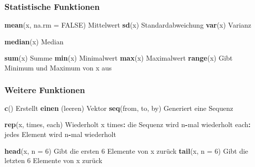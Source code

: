 \documentclass[
]{article}
\newenvironment{Shaded}{\begin{snugshade}}{\end{snugshade}}
\newcommand{\AttributeTok}[1]{\textcolor[rgb]{0.13,0.29,0.53}{#1}}
\newcommand{\ConstantTok}[1]{\textcolor[rgb]{0.56,0.35,0.01}{#1}}
\newcommand{\DecValTok}[1]{\textcolor[rgb]{0.00,0.00,0.81}{#1}}
\newcommand{\FunctionTok}[1]{\textcolor[rgb]{0.13,0.29,0.53}{\textbf{#1}}}
\newcommand{\NormalTok}[1]{#1}
\newcommand{\SpecialCharTok}[1]{\textcolor[rgb]{0.81,0.36,0.00}{\textbf{#1}}}
\begin{document}
\hypertarget{statistische-funktionen}{%
\subsubsection{Statistische Funktionen}\label{statistische-funktionen}}

\begin{Shaded}
\begin{Highlighting}[]
\FunctionTok{mean}\NormalTok{(x, }\AttributeTok{na.rm =} \ConstantTok{FALSE}\NormalTok{)  Mittelwert}
\FunctionTok{sd}\NormalTok{(x)                   Standardabweichung}
\FunctionTok{var}\NormalTok{(x)                  Varianz}

\FunctionTok{median}\NormalTok{(x)               Median}

\FunctionTok{sum}\NormalTok{(x)                  Summe}
\FunctionTok{min}\NormalTok{(x)                  Minimalwert}
\FunctionTok{max}\NormalTok{(x)                  Maximalwert}
\FunctionTok{range}\NormalTok{(x)                Gibt Minimum und Maximum von x aus}
\end{Highlighting}
\end{Shaded}

\hypertarget{weitere-funktionen}{%
\subsubsection{Weitere Funktionen}\label{weitere-funktionen}}

\begin{Shaded}
\begin{Highlighting}[]
\FunctionTok{c}\NormalTok{()                     Erstellt }\FunctionTok{einen}\NormalTok{ (leeren) Vektor}
\FunctionTok{seq}\NormalTok{(from, to, by)       Generiert eine Sequenz}

\FunctionTok{rep}\NormalTok{(x, times, each)     Wiederholt x }
\NormalTok{                          times}\SpecialCharTok{:}\NormalTok{ die Sequenz wird n}\SpecialCharTok{{-}}\NormalTok{mal wiederholt}
\NormalTok{                          each}\SpecialCharTok{:}\NormalTok{ jedes Element wird n}\SpecialCharTok{{-}}\NormalTok{mal wiederholt}
                          
\FunctionTok{head}\NormalTok{(x, }\AttributeTok{n =} \DecValTok{6}\NormalTok{)          Gibt die ersten }\DecValTok{6}\NormalTok{ Elemente von x zurück}
\FunctionTok{tail}\NormalTok{(x, }\AttributeTok{n =} \DecValTok{6}\NormalTok{)          Gibt die letzten }\DecValTok{6}\NormalTok{ Elemente von x zurück}
\end{Highlighting}
\end{Shaded}
\end{document}
